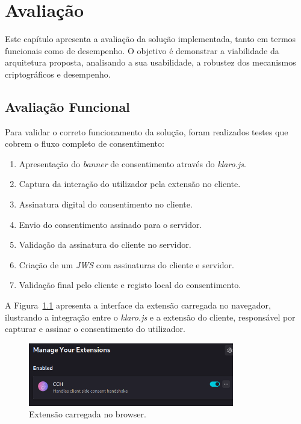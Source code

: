 \chapter{Avaliação}
\label{cap:avaliacao}

Este capítulo apresenta a avaliação da solução implementada, tanto em termos funcionais como de desempenho. O objetivo é demonstrar a viabilidade da arquitetura proposta, analisando a sua usabilidade, a robustez dos mecanismos criptográficos e desempenho.

\section{Avaliação Funcional}

Para validar o correto funcionamento da solução, foram realizados testes que cobrem o fluxo completo de consentimento:

\begin{enumerate}
    \item Apresentação do \textit{banner} de consentimento através do \textit{klaro.js}.
    \item Captura da interação do utilizador pela extensão no cliente.
    \item Assinatura digital do consentimento no cliente.
    \item Envio do consentimento assinado para o servidor.
    \item Validação da assinatura do cliente no servidor.
    \item Criação de um \textit{JWS} com assinaturas do cliente e servidor.
    \item Validação final pelo cliente e registo local do consentimento.
\end{enumerate}

A Figura~\ref{fig:cch} apresenta a interface da extensão carregada no navegador, ilustrando a integração entre o \textit{klaro.js} e a extensão do cliente, responsável por capturar e assinar o consentimento do utilizador.

\begin{figure}[h]
    \centering
	\includegraphics[width=0.8\textwidth]{images/cch.png}
    \caption{Extensão carregada no browser.}
    \label{fig:cch}
\end{figure}

